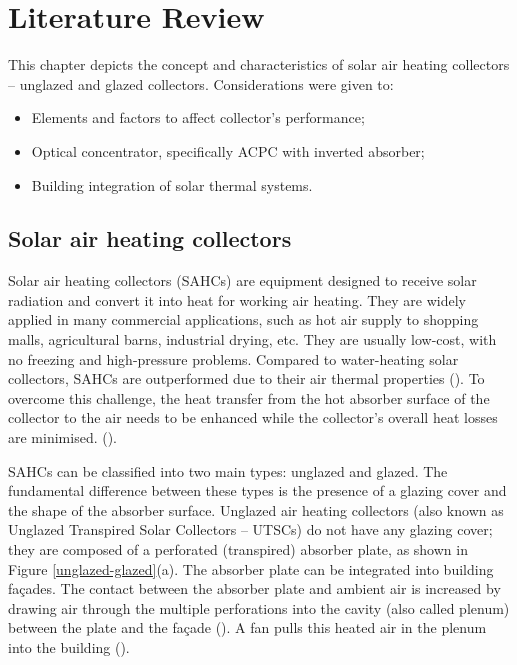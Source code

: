 \chapter{Literature Review}
\label{Cap:Lit}
%

This chapter depicts the concept and characteristics of solar air heating collectors -- unglazed and glazed collectors. Considerations were given to:

\begin{itemize}
	\item Elements and factors to affect collector's performance;
	\item Optical concentrator, specifically ACPC with inverted absorber;
	\item Building integration of solar thermal systems.
\end{itemize}


\section{Solar air heating collectors}

Solar air heating collectors (SAHCs) are equipment designed to receive solar radiation and convert it into heat for working air heating. They are widely applied in many commercial applications, such as hot air supply to shopping malls, agricultural barns, industrial drying, etc. They are usually low-cost, with no freezing and high-pressure problems. Compared to water-heating solar collectors, SAHCs are outperformed due to their air thermal properties (\cite{Buker2015}). To overcome this challenge, the heat transfer from the hot absorber surface of the collector to the air needs to be enhanced while the collector's overall heat losses are minimised. (\cite{Shams2013}).

SAHCs can be classified into two main types: unglazed and glazed. The fundamental difference between these types is the presence of a glazing cover and the shape of the absorber surface. Unglazed air heating collectors (also known as Unglazed Transpired Solar Collectors -- UTSCs) do not have any glazing cover; they are composed of a perforated (transpired) absorber plate, as shown in Figure \ref{unglazed-glazed}(a). The absorber plate can be integrated into building fa{\c c}ades. The contact between the absorber plate and ambient air is increased by drawing air through the multiple perforations into the cavity (also called plenum) between the plate and the fa{\c c}ade (\cite{Shukla2012}). A fan pulls this heated air in the plenum into the building (\cite{Buker2015}).

